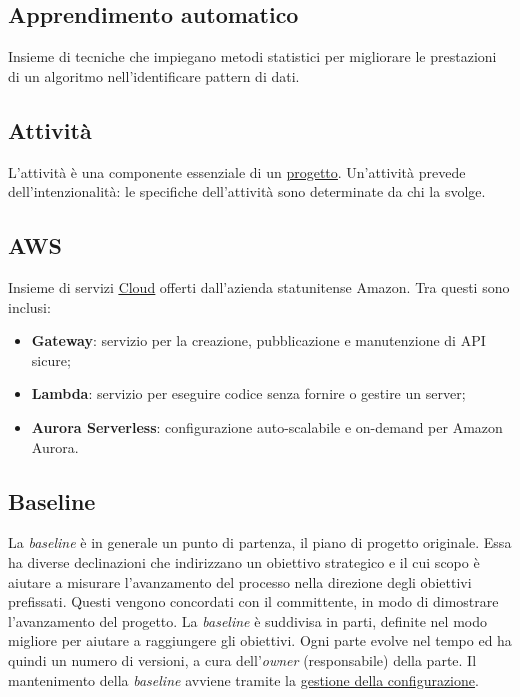 	\subsection{Apprendimento automatico}
	\label{sec:app-auto}
	Insieme di tecniche che impiegano metodi statistici per migliorare le prestazioni di un algoritmo nell'identificare pattern di dati.

	\subsection{Attività}
	\label{sec:attivita}
	L'attività è una componente essenziale di un \underline{\hyperref[sec:progetto]{progetto}}. Un'attività prevede dell'intenzionalità: le specifiche dell'attività sono determinate da chi la svolge.

	\subsection{AWS}
	\label{sec:aws}
	Insieme di servizi \underline{\hyperref[sec:cloud]{Cloud}} offerti dall'azienda statunitense Amazon. Tra questi sono inclusi:
	\begin{itemize}
		\item \textbf{Gateway}: servizio per la creazione, pubblicazione e manutenzione di API sicure;
		\item \textbf{Lambda}: servizio per eseguire codice senza fornire o gestire un server;
		\item \textbf{Aurora Serverless}: configurazione auto-scalabile e on-demand per Amazon Aurora.
	\end{itemize}

	\newpage
	\subsection{Baseline}
	\label{sec:baseline}
	La \emph{baseline} è in generale un punto di partenza, il piano di progetto originale. Essa ha diverse declinazioni che indirizzano un obiettivo strategico e il cui scopo è aiutare a misurare l'avanzamento del processo nella direzione degli obiettivi prefissati. Questi vengono concordati con il committente, in modo di dimostrare l'avanzamento del progetto. La  \emph{baseline} è suddivisa in parti, definite nel modo migliore per aiutare a raggiungere gli obiettivi. Ogni parte evolve nel tempo ed ha quindi un numero di versioni, a cura dell'\emph{owner} (responsabile) della parte. Il mantenimento della  \emph{baseline} avviene tramite la \underline{\hyperref[sec:controlloconfigurazione]{gestione della configurazione}}.

